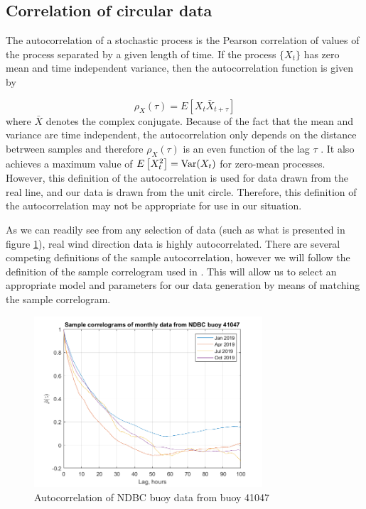 \documentclass[12pt]{article}
\numberwithin{equation}{section}
\numberwithin{figure}{section}
\begin{document}
\subsection{Correlation of circular data}\label{correlation}

The autocorrelation of a stochastic process is the Pearson correlation of values of the process separated by a given length of time. If the process $\{X_t\}$ has zero mean and time independent variance, then the autocorrelation function is given by

\begin{equation}\label{eq:autocorr}
\rho_{X}(\tau) = E\left[X_t \bar{X}_{t+\tau}\right]
\end{equation}
where $\bar{X}$ denotes the complex conjugate. Because of the fact that the mean and variance are time independent, the autocorrelation only depends on the distance betrween samples and therefore $\rho_{X}(\tau)$ is an even function of the lag $\tau$  \cite{Gubner}. It also achieves a maximum value of $E\left[X_t^2\right]= \textnormal{Var}(X_t)$ for zero-mean processes. However, this definition of the autocorrelation is used for data drawn from the real line, and our data is drawn from the unit circle. Therefore, this definition of the autocorrelation may not be appropriate for use in our situation.

As we can readily see from any selection of data (such as what is presented in figure \ref{fig:ex ac}), real wind direction data is highly autocorrelated. There are several competing definitions of the sample autocorrelation, however we will follow the definition of the sample correlogram used in \cite{fisher}. This will allow us to select an appropriate model and parameters for our data generation by means of matching the sample correlogram.

\begin{figure}[h]
\centering
\includegraphics[width=85mm]{New Folder/example correlograms.png}
\caption{Autocorrelation of NDBC buoy data from buoy 41047}\label{fig:ex ac}
\end{figure}
\end{document}
